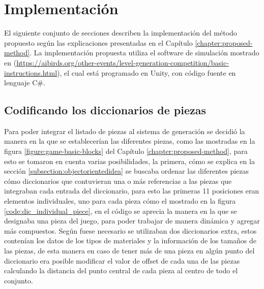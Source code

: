 \chapter{Implementación}
\label{chapter:implementation}

El siguiente conjunto de secciones describen la implementación del método
propuesto según las explicaciones presentadas en el Capítulo
\ref{chapter:proposed-method}. La implementación propuesta utiliza el software
de simulación mostrado en \cite{Renz2013}
(\url{https://aibirds.org/other-events/level-generation-competition/basic-instructions.html}),
el cual está programado en Unity, con código fuente en
lenguaje C\#.

\section{Codificando los diccionarios de piezas}
\label{section:piece_dictionary}

Para poder integrar el listado de piezas al
sistema de generación se decidió la manera en la que se establecerían las
diferentes piezas, como las mostradas en la figura \ref{figure:game-basic-blocks}
del Capítulo \ref{chapter:proposed-method}, para esto se tomaron en cuenta
varias posibilidades, la primera, cómo se explica en la sección
\ref{subsection:objectorientedidea} se buscaba ordenar las diferentes piezas
cómo diccionarios que contuvieran una o más referencias a las piezas que
integraban cada entrada del diccionario, para esto las primeras 11 posiciones
eran elementos individuales, uno para cada pieza cómo el mostrado en la figura
\ref{code:dic_individual_piece}, en el código se aprecia la manera en la que se
designaba una pieza del juego, para poder trabajar de manera dinámica y
agregar más compuestos. Según fuese necesario se utilizaban dos diccionarios
extra, estos contenían los datos de los tipos de materiales y la
información de los tamaños de las piezas, de esta manera en caso de tener más de
una pieza en algún punto del diccionario era posible modificar el valor de
offset de cada una de las piezas calculando la distancia del punto central de
cada pieza al centro de todo el conjunto.

